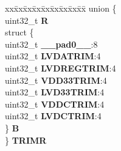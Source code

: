 \begin{DoxyCompactItemize}
\begin{tabbing}
\end{tabbing}\item 
\mbox{\label{structPMC__tag_a6a37d78b92d37af5790572f5dcd36faa}} 
\begin{tabbing}
xx\=xx\=xx\=xx\=xx\=xx\=xx\=xx\=xx\=\kill
union \{\\
\>uint32\_t {\bfseries R}\\
\>struct \{\\
\>\>uint32\_t {\bfseries \_\_pad0\_\_}:8\\
\>\>uint32\_t {\bfseries LVDATRIM}:4\\
\>\>uint32\_t {\bfseries LVDREGTRIM}:4\\
\>\>uint32\_t {\bfseries VDD33TRIM}:4\\
\>\>uint32\_t {\bfseries LVD33TRIM}:4\\
\>\>uint32\_t {\bfseries VDDCTRIM}:4\\
\>\>uint32\_t {\bfseries LVDCTRIM}:4\\
\>\} {\bfseries B}\\
\} {\bfseries TRIMR}\\


\end{tabbing}
\end{DoxyCompactItemize}
